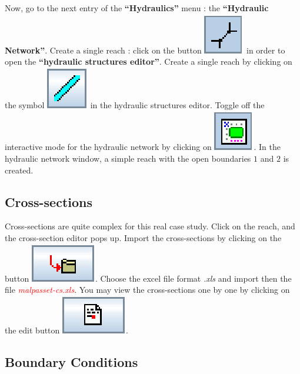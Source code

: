 \documentclass[a4paper,12pt]{article}
\begin{document}
Now, go to the next entry of the \textbf{{}``Hydraulics''} menu
: the \textbf{{}``Hydraulic Network''}. Create a single reach :
click on the button \includegraphics[scale=0.6]{create_nw}
in order to open the \textbf{{}``hydraulic structures editor''}.
Create a single reach by clicking on the symbol \includegraphics[scale=0.6]{reach}
in the hydraulic structures editor. Toggle off the interactive mode
for the hydraulic network by clicking on \includegraphics[scale=0.6]{edit_nw}.
In the hydraulic network window, a simple reach with the open boundaries
$1$ and $2$ is created.


\subsection{Cross-sections }

\hspace{0.5cm}Cross-sections are quite complex for this real case study. Click on
the reach, and the cross-section editor pops up. Import the cross-sections
by clicking on the button \includegraphics[scale=0.6]{import}.
Choose the excel file format \textit{.xls} and import then the file \textcolor{red}{\textit{malpasset-cs.xls}}.
You may view the cross-sections one by one by clicking on the edit
button \includegraphics[scale=0.6]{edit}.


\subsection{Boundary Conditions 
}
\end{document}

